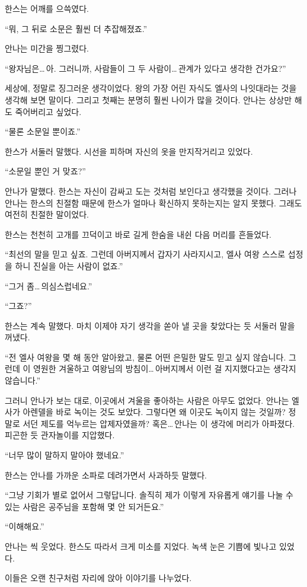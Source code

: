 한스는 어깨를 으쓱였다.

``뭐, 그 뒤로 소문은 훨씬 더 추잡해졌죠.''

안나는 미간을 찡그렸다.

``왕자님은\ldots\,아. 그러니까, 사람들이 그 두 사람이\ldots\,관계가 있다고 생각한 건가요?''

세상에, 정말로 징그러운 생각이었다. 왕의 가장 어린 자식도 엘사의 나잇대라는 것을 생각해 보면 말이다. 그리고 첫째는 분명히 훨씬 나이가 많을 것이다. 안나는 상상만 해도 죽어버리고 싶었다.

``물론 소문일 뿐이죠.''

한스가 서둘러 말했다. 시선을 피하며 자신의 옷을 만지작거리고 있었다.

`` 소문일 뿐인 거 맞죠?''

안나가 말했다. 한스는 자신이 감싸고 도는 것처럼 보인다고 생각했을 것이다. 그러나 안나는 한스의 친절함 때문에 한스가 얼마나 확신하지 못하는지는 알지 못했다. 그래도 여전히 친절한 말이었다.

한스는 천천히 고개를 끄덕이고 바로 길게 한숨을 내쉰 다음 머리를 흔들었다.

``최선의 말을 믿고 싶죠. 그런데 아버지께서 갑자기 사라지시고, 엘사 여왕 스스로 섭정을 하니 진실을 아는 사람이 없죠.''

``그거 좀\ldots\,의심스럽네요.''

``그죠?''

한스는 계속 말했다. 마치 이제야 자기 생각을 쏟아 낼 곳을 찾았다는 듯 서둘러 말을 꺼냈다.

``전 엘사 여왕을 몇 해 동안 알아왔고, 물론 어떤 은밀한 말도 믿고 싶지 않습니다. 그런데 이 영원한 겨울하고 여왕님의 방침이\ldots\,아버지께서 이런 걸 지지했다고는 생각지 않습니다.''

그러니 안나가 보는 대로, 이곳에서 겨울을 좋아하는 사람은 아무도 없었다. 안나는 엘사가 아렌델을 바로 녹이는 것도 보았다. 그렇다면 왜 이곳도 녹이지 않는 것일까? 정말로 서던 제도를 억누르는 압제자였을까? 혹은\ldots\,안나는 이 생각에 머리가 아파졌다. 피곤한 듯 관자놀이를 지압했다.

``너무 많이 말하지 말아야 했네요.''

한스는 안나를 가까운 소파로 데려가면서 사과하듯 말했다.

``그냥 기회가 별로 없어서 그렇답니다. 솔직히 제가 이렇게 자유롭게 얘기를 나눌 수 있는 사람은 공주님을 포함해 몇 안 되거든요.''

``이해해요.''

안나는 씩 웃었다. 한스도 따라서 크게 미소를 지었다. 녹색 눈은 기쁨에 빛나고 있었다.

이들은 오랜 친구처럼 자리에 앉아 이야기를 나누었다.

